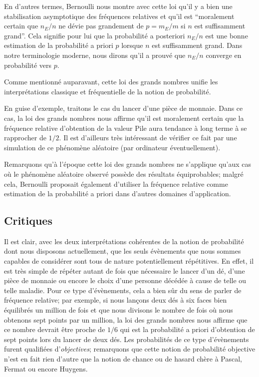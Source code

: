 \documentclass[11pt,a4paper]{article}
\begin{document}
En d'autres termes, Bernoulli nous montre avec cette loi qu'il y a bien une stabilisation asymptotique des fréquences relatives et qu'il est ``moralement certain que $n_E/n$ ne dévie pas grandement de $p = m_E/m$ si $n$ est suffisamment grand''. Cela signifie pour lui que la probabilité a posteriori $n_E/n$ est une bonne estimation de la probabilité a priori $p$ lorsque $n$ est suffisamment grand. Dans notre terminologie moderne, nous dirons qu'il a prouvé que $n_E/n$ converge en probabilité vers $p$.

Comme mentionné auparavant, cette loi des grands nombres unifie les interprétations classique et fréquentielle de la notion de probabilité.

En guise d'exemple, traitons le cas du lancer d'une pièce de monnaie. Dans ce cas, la loi des grands nombres nous affirme qu'il est moralement certain que la fréquence relative d'obtention de la valeur Pile aura tendance à long terme à se rapprocher de $1/2$. Il est d'ailleurs très intéressant de vérifier ce fait par une simulation de ce phénomène aléatoire (par ordinateur éventuellement).

Remarquons qu'à l'époque cette loi des grands nombres ne s'applique qu'aux cas où le phénomène aléatoire observé possède des résultats équiprobables; malgré cela, Bernoulli proposait également d'utiliser la fréquence relative comme estimation de la probabilité a priori dans d'autres domaines d'application.

\subsection{Critiques}

Il est clair, avec les deux interprétations cohérentes de la notion de probabilité dont nous disposons actuellement, que les seuls évènements que nous sommes capables de considérer sont tous de nature potentiellement répétitives. En effet, il est très simple de répéter autant de fois que nécessaire le lancer d'un dé, d'une pièce de monnaie ou encore le choix d'une personne décédée à cause de telle ou telle maladie. Pour ce type d'évènements, cela a bien sûr du sens de parler de fréquence relative; par exemple, si nous lançons deux dés à six faces bien équilibrés un million de fois et que nous divisons le nombre de fois où nous obtenons sept points par un million, la loi des grands nombres nous affirme que ce nombre devrait être proche de $1/6$ qui est la probabilité a priori d'obtention de sept points lors du lancer de deux dés. Les probabilités de ce type d'évènements furent qualifiées d'\textit{objectives}; remarquons que cette notion de probabilité objective n'est en fait rien d'autre que la notion de chance ou de hasard chère à Pascal, Fermat ou encore Huygens.
\end{document}
